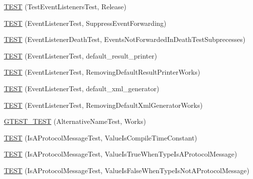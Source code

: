 \begin{DoxyCompactItemize}
\item 
\mbox{\hyperlink{googletest-master_2googletest_2test_2gtest__unittest_8cc_aefe7d8b3422fb27b9c7281c0434881be}{T\+E\+ST}} (Test\+Event\+Listeners\+Test, Release)
\item 
\mbox{\hyperlink{googletest-master_2googletest_2test_2gtest__unittest_8cc_abdd2f070281db35988b7f6c22f2623e7}{T\+E\+ST}} (Event\+Listener\+Test, Suppress\+Event\+Forwarding)
\item 
\mbox{\hyperlink{googletest-master_2googletest_2test_2gtest__unittest_8cc_a3e3bfce9c199215053e43d9d1a248af8}{T\+E\+ST}} (Event\+Listener\+Death\+Test, Events\+Not\+Forwarded\+In\+Death\+Test\+Subprecesses)
\item 
\mbox{\hyperlink{googletest-master_2googletest_2test_2gtest__unittest_8cc_a6fa482480599861df0c182c4d4229133}{T\+E\+ST}} (Event\+Listener\+Test, default\+\_\+result\+\_\+printer)
\item 
\mbox{\hyperlink{googletest-master_2googletest_2test_2gtest__unittest_8cc_a32187fe0e1d4620d0ed5a7c6cc7254b8}{T\+E\+ST}} (Event\+Listener\+Test, Removing\+Default\+Result\+Printer\+Works)
\item 
\mbox{\hyperlink{googletest-master_2googletest_2test_2gtest__unittest_8cc_aff2c25cbedbe72d8bb0162bc1bd0fece}{T\+E\+ST}} (Event\+Listener\+Test, default\+\_\+xml\+\_\+generator)
\item 
\mbox{\hyperlink{googletest-master_2googletest_2test_2gtest__unittest_8cc_a77647d09c995f09d06e2f02b13277c44}{T\+E\+ST}} (Event\+Listener\+Test, Removing\+Default\+Xml\+Generator\+Works)
\item 
\mbox{\hyperlink{googletest-master_2googletest_2test_2gtest__unittest_8cc_a54247aeadc0617105812dca8609638de}{G\+T\+E\+S\+T\+\_\+\+T\+E\+ST}} (Alternative\+Name\+Test, Works)
\item 
\mbox{\hyperlink{googletest-master_2googletest_2test_2gtest__unittest_8cc_a92eccf2c14f70b39d88564370690b303}{T\+E\+ST}} (Is\+A\+Protocol\+Message\+Test, Value\+Is\+Compile\+Time\+Constant)
\item 
\mbox{\hyperlink{googletest-master_2googletest_2test_2gtest__unittest_8cc_ac9103349aa0cc06b769d69f0e8106997}{T\+E\+ST}} (Is\+A\+Protocol\+Message\+Test, Value\+Is\+True\+When\+Type\+Is\+A\+Protocol\+Message)
\item 
\mbox{\hyperlink{googletest-master_2googletest_2test_2gtest__unittest_8cc_a5f72b1b55ea8c769dc1c6c182f4d9be2}{T\+E\+ST}} (Is\+A\+Protocol\+Message\+Test, Value\+Is\+False\+When\+Type\+Is\+Not\+A\+Protocol\+Message)
\item 

\end{DoxyCompactItemize}
